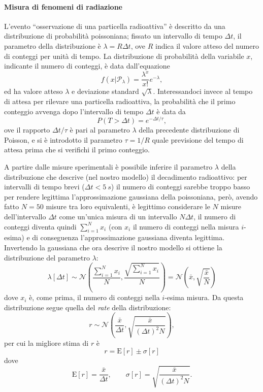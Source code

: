 \documentclass[10pt,oneside,a4paper]{article}
\begin{document}
\paragraph{Misura di fenomeni di radiazione}
L'evento ``osservazione di una particella radioattiva'' è descritto da una distribuzione di probabilità poissoniana; fissato un intervallo di tempo $\Delta t$, il parametro della distribuzione è $\lambda = R\Delta t$, ove $R$ indica il valore atteso del numero di conteggi per unità di tempo. La distribuzione di probabilità della variabile $x$, indicante il numero di conteggi, è data dall'equazione
\begin{equation}\label{eq:Poisson}
f(x\vert \mathcal{P}_{\lambda}) = \frac{\lambda^x}{x!}e^{-\lambda},
\end{equation}
ed ha valore atteso $\lambda$ e deviazione standard $\sqrt{\lambda}$.
Interessandoci invece al tempo di attesa per rilevare una particella radioattiva, la probabilità che il primo conteggio avvenga dopo l'intervallo di tempo $\Delta t$ è data da
\[
P(T > \Delta t) = e^{-\Delta t / \tau},
\]
ove il rapporto $\Delta t / \tau$ è pari al parametro $\lambda$ della precedente distribuzione di Poisson, e si è introdotto il parametro $\tau = 1 / R$ quale previsione del tempo di attesa prima che si verifichi il primo conteggio. 

A partire dalle misure sperimentali è possibile inferire il parametro $\lambda$ della distribuzione che descrive (nel nostro modello) il decadimento radioattivo: per intervalli di tempo brevi ($\Delta t < \SI{5}{s}$) il numero di conteggi sarebbe troppo basso per rendere legittima l'approssimazione gaussiana della poissoniana, però, avendo fatto $N = 50$ misure tra loro equivalenti, è legittimo considerare le $N$ misure dell'intervallo $\Delta t$ come un'unica misura di un intervallo $N \Delta t$, il numero di conteggi diventa quindi $\sum_{i=1}^N x_i$ (con $x_i$ il numero di conteggi nella misura $i$-esima) e di conseguenza l'approssimazione gaussiana diventa legittima. Invertendo la gaussiana che ora descrive il nostro modello si ottiene la distribuzione del parametro $\lambda$:
\begin{equation}\label{eq:distribuzione_lambda}
	\lambda[\Delta t]  \sim \mathscr{N} \left( \frac{\sum_{i=1}^N x_i}{N} , \frac{\sqrt{\sum_{i=1}^N x_i}}{N} \right) = \mathscr{N} \left( \bar{x}, \sqrt{\frac{\bar{x}}{N}} \right)
\end{equation}
dove $x_i$ è, come prima, il numero di conteggi nella $i$-esima misura. Da questa distribuzione segue quella del \emph{rate} della distribuzione:
\begin{equation}\label{eq:distribuzione_r}
	r \sim \mathscr{N} \left( \frac{\bar{x}}{\Delta t}, \sqrt{\frac{\bar{x}}{(\Delta t)^2 N}} \right),
\end{equation}
per cui la migliore stima di $r$ è
\begin{equation}\label{eq:stima_r}
	r = \mathrm{E}[r] \pm \sigma [r]
\end{equation} dove
\[
	\mathrm{E}[r] = \frac{\bar{x}}{\Delta t}, \qquad \sigma [r] = \sqrt{\frac{\bar{x}}{(\Delta t)^2 N}}.
\]
\end{document}
